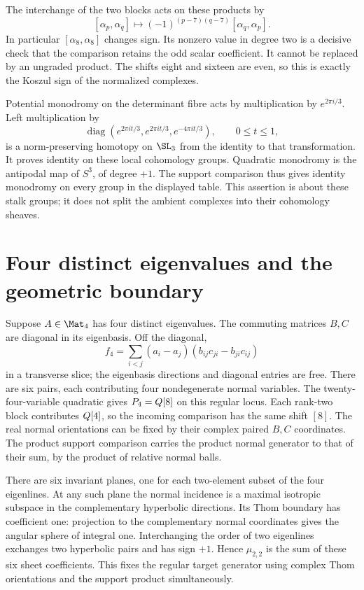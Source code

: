 The interchange of the two blocks acts on these products by
\[
 [\alpha_p,\alpha_q]\longmapsto
       (-1)^{(p-7)(q-7)}[\alpha_q,\alpha_p].
\]
In particular $[\alpha_8,\alpha_8]$ changes sign. Its nonzero value
in degree two is a decisive check that the comparison retains the
odd scalar coefficient. It cannot be replaced by an ungraded product.
The shifts eight and sixteen are even, so this is exactly the
Koszul sign of the normalized complexes.

Potential monodromy on the determinant fibre acts by multiplication
by $e^{2\pi i/3}$. Left multiplication by
\[
 \operatorname{diag}(e^{2\pi it/3},e^{2\pi it/3},e^{-4\pi it/3}),
 \qquad 0\le t\le1,
\]
is a norm-preserving homotopy on $\SL_3$ from the identity to that
transformation. It proves identity on these local cohomology groups.
Quadratic monodromy is the antipodal map of $S^3$, of degree $+1$.
The support comparison thus gives identity monodromy on every group
in the displayed table. This assertion is about these stalk groups;
it does not split the ambient complexes into their cohomology sheaves.

\section{Four distinct eigenvalues and the geometric boundary}
\label{ts22:sec:regular}

Suppose $A\in\Mat_4$ has four distinct eigenvalues. The commuting
matrices $B,C$ are diagonal in its eigenbasis. Off the diagonal,
\[
 f_4=\sum_{i<j}(a_i-a_j)
                 (b_{ij}c_{ji}-b_{ji}c_{ij})
\]
in a transverse slice; the eigenbasis directions and diagonal entries
are free. There are six pairs, each contributing four nondegenerate
normal variables. The twenty-four-variable quadratic gives
$P_4=Q[8]$ on this regular locus. Each rank-two block contributes
$Q[4]$, so the incoming comparison has the same shift $[8]$.
The real normal orientations can be fixed by their complex paired
$B,C$ coordinates. The product support comparison carries the product
normal generator to that of their sum, by the product of relative
normal balls.

There are six invariant planes, one for each two-element subset of
the four eigenlines. At any such plane the normal incidence is a
maximal isotropic subspace in the complementary hyperbolic directions.
Its Thom boundary has coefficient one: projection to the complementary
normal coordinates gives the angular sphere of integral one.
Interchanging the order of two eigenlines exchanges two hyperbolic
pairs and has sign $+1$. Hence $\mu_{2,2}$ is the sum of these six
sheet coefficients. This fixes the regular target generator using
complex Thom orientations and the support product simultaneously.

